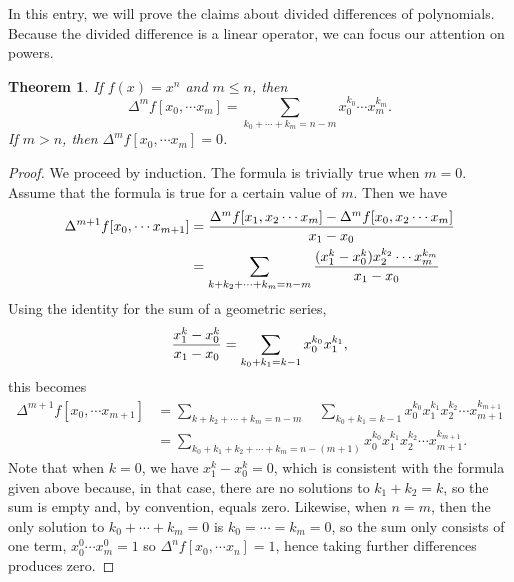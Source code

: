 \documentclass[12pt]{article}
\newtheorem{thm}{Theorem}
\begin{document}
In this entry, we will prove the claims about divided differences 
of polynomials.  Because the divided difference is a linear
operator, we can focus our attention on powers.  

\begin{thm}
If $f(x) = x^n$ and $m \le n$, then
\[
\Delta^m f [x_0, \cdots x_m] = 
\sum_{k_0 + \cdots + k_m = n - m} x_0^{k_0} \cdots x_m^{k_m}.
\]
If $m > n$, then $\Delta^m f [x_0, \cdots x_m] = 0$.
\end{thm}

\begin{proof}
We proceed by induction.  The formula is trivially true
when $m = 0$.  Assume that the formula is true for a
certain value of $m$.  Then we have
\begin{align*}
\Delta^{m+1} f [x_0, \cdots x_{m+1}] &= 
{\Delta^m f [x_1, x_2 \cdots x_m] - \Delta^m f [x_0, x_2 \cdots x_m]
 \over x_1 - x_0} \\ &=
\sum_{k + k_2 + \cdots + k_m = n - m} 
{(x_1^k - x_0^k) x_2^{k_2} \cdots x_m^{k_m}
 \over x_1 - x_0}
\end{align*}
Using the identity for the sum of a geometric series,
\[
{x_1^k - x_0^k \over x_1 - x_0} =
\sum_{k_0 + k_1 = k - 1} x_0^{k_0} x_1^{k_1},
\]
this becomes
\begin{align*}
\Delta^{m+1} f [x_0, \cdots x_{m+1}] &= 
\sum_{k + k_2 + \cdots + k_m = n - m} \quad
\sum_{k_0 + k_1 = k - 1} 
x_0^{k_0} x_1^{k_1} x_2^{k_2} \cdots x_{m+1}^{k_{m+1}} \\ &=
\sum_{k_0 + k_1 + k_2 + \cdots + k_m = n - (m + 1)}
x_0^{k_0} x_1^{k_1} x_2^{k_2} \cdots x_{m+1}^{k_{m+1}}.
\end{align*}
Note that when $k=0$, we have $x_1^k - x_0^k = 0$, which
is consistent with the formula given above because, in that
case, there are no solutions to $k_1 + k_2 = k$, so the 
sum is empty and, by convention, equals zero.  Likewise,
when $n=m$, then the only solution to $k_0 + \cdots + k_m = 0$
is $k_0 = \cdots = k_m = 0$, so the sum only consists of
one term, $x_0^0 \cdots x_m^0 = 1$ so 
$\Delta^n f [x_0, \cdots x_n] = 1$, hence taking
further differences produces zero.
\end{proof}
\end{document}

